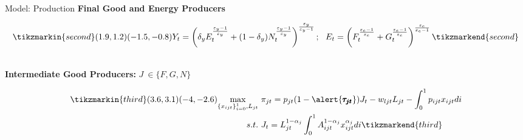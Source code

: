 \documentclass[11pt,aspectratio=169]{beamer}
\begin{document}
\begin{frame}{Model: Production}
\textbf{Final Good and Energy Producers }
\vspace{-5mm}
	\begin{minipage}[t!]{1\textwidth}
		\begin{align*}
		\tikzmarkin{second}(1.9,1.2)(-1.5,-0.8)
Y_t=\left(\delta_yE_t^\frac{\varepsilon_y-1}{\varepsilon_y}+(1-\delta_y)N_t^\frac{\varepsilon_y-1}{\varepsilon_y}\right)^\frac{\varepsilon_y}{\varepsilon_y-1}; \ \ 
E_t=\left({F}_t^\frac{\varepsilon_e-1}{\varepsilon_e}+G_t^\frac{\varepsilon_e-1}{\varepsilon_e}\right)^\frac{\varepsilon_e}{\varepsilon_e-1}
\tikzmarkend{second}
\end{align*}
	\end{minipage}
\\

\vspace{12mm}
\textbf{Intermediate Good Producers:} $J\ \in\{F,G,N\}$
	\vspace{-3mm}
\begin{minipage}[t!]{1\textwidth}
	\begin{align*}
	\tikzmarkin{third}(3.6,3.1)(-4,-2.6)
\underset{\{x_{ijt}\}_{i=0}^1, L_{jt}}{\max}\ & \pi_{jt}=p_{jt}(1-\alert{\pmb{\tau_{jt}}})J_t-w_{ljt}L_{jt}-\int_{0}^{1}p_{ijt}x_{ijt}di\\ 
 s.t.\ & J_{t}=L_{jt}^{1-\alpha_j}\int_{0}^{1}A^{1-\alpha_j}_{ijt}x_{ijt}^{\alpha_j}di 
	\tikzmarkend{third}
	\end{align*}
\end{minipage}
\end{frame}
\end{document}
